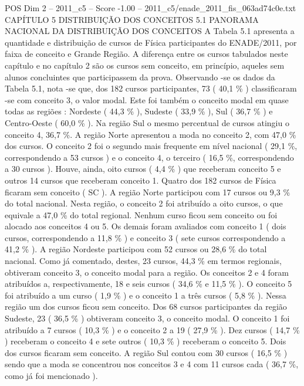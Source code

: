\begin{textsample}{POS Dim 2 – 2011\_c5 – Score -1.00 – 2011\_c5/enade\_2011\_fis\_063ad74c0e.txt}  \label{ex:f2_pos_354}
CAPÍTULO 5 DISTRIBUIÇÃO DOS CONCEITOS 5.1 PANORAMA NACIONAL DA DISTRIBUIÇÃO DOS CONCEITOS A Tabela 5.1 apresenta a quantidade e distribuição de cursos de Física participantes do ENADE/2011, por faixa de conceito e Grande Região.
A diferença entre os cursos tabulados neste capítulo e no capítulo 2 são os cursos sem conceito, em princípio, aqueles sem alunos concluintes que participassem da prova.
Observando -se os dados da Tabela 5.1, nota -se que, dos 182 cursos participantes, 73 ( 40,1 \% ) classificaram -se com conceito 3, o valor modal.
Este foi também o conceito modal em quase todas as regiões : Nordeste ( 44,3 \% ), Sudeste ( 33,9 \% ), Sul ( 36,7 \% ) e Centro-Oeste ( 60,0 \% ).
Na região Sul o mesmo percentual de cursos atingiu o conceito 4, 36,7 \%.
A região Norte apresentou a moda no conceito 2, com 47,0 \% dos cursos.
O conceito 2 foi o segundo mais frequente em nível nacional ( 29,1 \%, correspondendo a 53 cursos ) e o conceito 4, o terceiro ( 16,5 \%, correspondendo a 30 cursos ).
Houve, ainda, oito cursos ( 4,4 \% ) que receberam conceito 5 e outros 14 cursos que receberam conceito 1.
Quatro dos 182 cursos de Física ficaram sem conceito ( SC ).
A região Norte participou com 17 cursos ou 9,3 \% do total nacional.
Nesta região, o conceito 2 foi atribuído a oito cursos, o que equivale a 47,0 \% do total regional.
Nenhum curso ficou sem conceito ou foi alocado aos conceitos 4 ou 5.
Os demais foram avaliados com conceito 1 ( dois cursos, correspondendo a 11,8 \% ) e conceito 3 ( sete cursos correspondendo a 41,2 \% ).
A região Nordeste participou com 52 cursos ou 28,6 \% do total nacional.
Como já comentado, destes, 23 cursos, 44,3 \% em termos regionais, obtiveram conceito 3, o conceito modal para a região.
Os conceitos 2 e 4 foram atribuídos a, respectivamente, 18 e seis cursos ( 34,6 \% e 11,5 \% ).
O conceito 5 foi atribuído a um curso ( 1,9 \% ) e o conceito 1 a três cursos ( 5,8 \% ).
Nessa região um dos cursos ficou sem conceito.
Dos 68 cursos participantes da região Sudeste, 23 ( 36,5 \% ) obtiveram conceito 3, o conceito modal.
O conceito 1 foi atribuído a 7 cursos ( 10,3 \% ) e o conceito 2 a 19 ( 27,9 \% ).
Dez cursos ( 14,7 \% ) receberam o conceito 4 e sete outros ( 10,3 \% ) receberam o conceito 5.
Dois dos cursos ficaram sem conceito.
A região Sul contou com 30 cursos ( 16,5 \% ) sendo que a moda se concentrou nos conceitos 3 e 4 com 11 cursos cada ( 36,7 \%, como já foi mencionado ).

\end{textsample}
